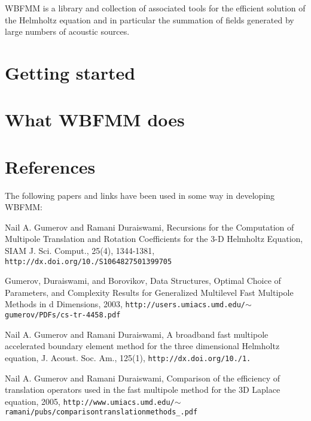 W\+B\+F\+M\+M is a library and collection of associated tools for the efficient solution of the Helmholtz equation and in particular the summation of fields generated by large numbers of acoustic sources.\section{Getting started}\label{index_start}
\section{What W\+B\+F\+M\+M does}\label{index_what}
\section{References}\label{index_references}
The following papers and links have been used in some way in developing W\+B\+F\+M\+M\+:


\begin{DoxyEnumerate}
\item Nail A. Gumerov and Ramani Duraiswami, Recursions for the Computation of Multipole Translation and Rotation Coefficients for the 3-\/\+D Helmholtz Equation, S\+I\+A\+M J. Sci. Comput., 25(4), 1344-\/1381, {\tt http\+://dx.\+doi.\+org/10./\+S1064827501399705}
\item Gumerov, Duraiswami, and Borovikov, Data Structures, Optimal Choice of Parameters, and Complexity Results for Generalized Multilevel Fast Multipole Methods in d Dimensions, 2003, {\tt http\+://users.\+umiacs.\+umd.\+edu/$\sim$gumerov/\+P\+D\+Fs/cs-\/tr-\/4458.\+pdf}
\item Nail A. Gumerov and Ramani Duraiswami, A broadband fast multipole accelerated boundary element method for the three dimensional Helmholtz equation, J. Acoust. Soc. Am., 125(1), {\tt http\+://dx.\+doi.\+org/10./1.}
\item Nail A. Gumerov and Ramani Duraiswami, Comparison of the efficiency of translation operators used in the fast multipole method for the 3\+D Laplace equation, 2005, {\tt http\+://www.\+umiacs.\+umd.\+edu/$\sim$ramani/pubs/comparisontranslationmethods\+\_.\+pdf} 
\end{DoxyEnumerate}